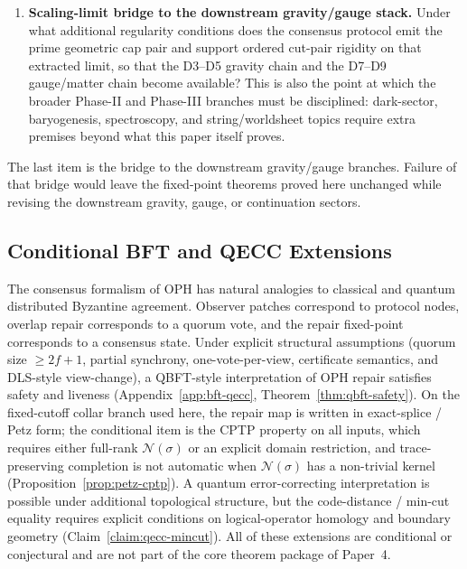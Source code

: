 \documentclass[11pt]{article}
\theoremstyle{remark}
\theoremstyle{plain}
\begin{document}
\begin{enumerate}
\item \textbf{Scaling-limit bridge to the downstream gravity/gauge stack.} Under what additional regularity conditions does the consensus protocol emit the prime geometric cap pair and support ordered cut-pair rigidity on that extracted limit, so that the D3--D5 gravity chain and the D7--D9 gauge/matter chain become available? This is also the point at which the broader Phase-II and Phase-III branches must be disciplined: dark-sector, baryogenesis, spectroscopy, and string/worldsheet topics require extra premises beyond what this paper itself proves.
\end{enumerate}

The last item is the bridge to the downstream gravity/gauge branches. Failure of that bridge would
leave the fixed-point theorems proved here unchanged while revising the downstream gravity, gauge,
or continuation sectors.

\subsection{Conditional BFT and QECC Extensions}
\label{subsec:conditional-bft-qecc}

The consensus formalism of \textrm{OPH} has natural analogies to classical and quantum
distributed Byzantine agreement. Observer patches correspond to protocol nodes, overlap repair
corresponds to a quorum vote, and the repair fixed-point corresponds to a consensus state. Under
explicit structural assumptions (quorum size $\geq 2f+1$, partial synchrony, one-vote-per-view,
certificate semantics, and \textrm{DLS}-style view-change), a \textrm{QBFT}-style interpretation
of \textrm{OPH} repair satisfies safety and liveness (Appendix~\ref{app:bft-qecc},
Theorem~\ref{thm:qbft-safety}). On the fixed-cutoff collar branch used here, the repair map is
written in exact-splice / Petz form; the conditional item is the \textrm{CPTP}
property on all inputs, which requires either full-rank $\mathcal{N}(\sigma)$ or an explicit
domain restriction, and trace-preserving completion is not automatic when
$\mathcal{N}(\sigma)$ has a non-trivial kernel
(Proposition~\ref{prop:petz-cptp}). A quantum error-correcting interpretation is possible under
additional topological structure, but the code-distance / min-cut equality requires explicit
conditions on logical-operator homology and boundary geometry (Claim~\ref{claim:qecc-mincut}). All
of these extensions are conditional or conjectural and are not part of the core theorem package of
Paper~4.
\end{document}

